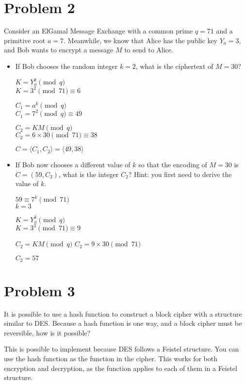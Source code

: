 \documentclass[11pt]{article}
\begin{document}
\section*{Problem 2}
Consider an ElGamal Message Exchange with a common prime $q = 71$ and a
primitive root $a = 7$. Meanwhile, we know that Alice has the public key
$Y_a = 3$, and Bob wants to encrypt a message $M$ to send to Alice.
\begin{itemize}
    \item If Bob chooses the random integer $k = 2$, what is the ciphertext of
        $M = 30$?

        $K = Y_a^k \pmod{q}$\\
        $K = 3^2 \pmod{71} \equiv 6$

        $C_1 = a^k \pmod{q}$\\
        $C_1 = 7^2 \pmod{q} \equiv 49$

        $C_2 = KM \pmod{q}$\\
        $C_2 = 6\times30 \pmod{71} \equiv 38$

        \vspace*{.1in}
        $C = \langle C_1, C_2 \rangle = \langle 49, 38 \rangle$

    \item If Bob now chooses a different value of $k$ so that the encoding of
          $M = 30$ is $C = (59, C_2)$, what is the integer $C_2$? Hint: you
          first need to derive the value of $k$.

          $59 \equiv 7^k \pmod{71}$\\
          $k = 3$

          $K = Y_a^k \pmod{q}$\\
          $K = 3^3 \pmod{71} \equiv 9$

          $C_2 = KM \pmod{q}$
          $C_2 = 9\times30 \pmod{71}$

          \vspace*{.1in}
          $C_2 = 57$
\end{itemize}

\clearpage
\section*{Problem 3}
It is possible to use a hash function to construct a block cipher with a
structure similar to DES. Because a hash function is one way, and a block
cipher must be reversible, how is it possible?

\vspace*{.1in}
This is possible to implement because DES follows a Feistel structure. You can
use the hash function as the function in the cipher. This works for both
encryption and decryption, as the function applies to each of them in a Feistel
structure.
\end{document}
